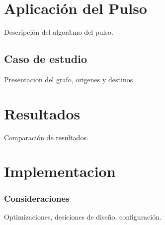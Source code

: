 \documentclass{article}
\begin{document}
  \section*{Aplicación del Pulso}
  
  Descripción del algorítmo del pulso.

  \subsection*{Caso de estudio}

  Presentacion del grafo, origenes y destinos.

  \section*{Resultados}

  Comparación de resultados.

  \section*{Implementacion}

  \subsubsection*{Consideraciones}

  Optimizaciones, desiciones de diseño, configuración.
\end{document}

